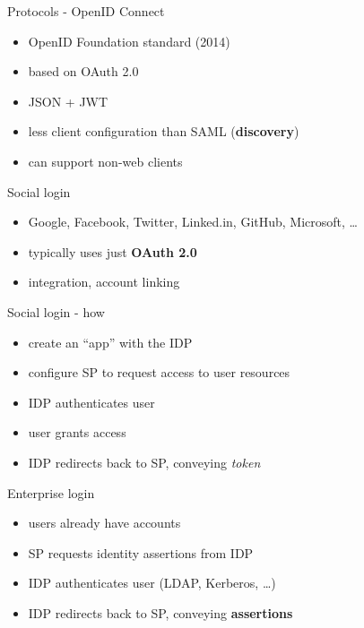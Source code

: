 \documentclass[ignorenonframetext,aspectratio=169]{beamer}
\providecommand{\tightlist}{%
  \setlength{\itemsep}{0pt}\setlength{\parskip}{0pt}}
\begin{document}
\begin{frame}{Protocols - OpenID Connect}

\begin{itemize}
\tightlist
\item OpenID Foundation standard (2014)
\item based on OAuth 2.0
\item JSON + JWT
\item less client configuration than SAML ({\bf discovery})
\item can support non-web clients
\end{itemize}

\end{frame}

\begin{frame}{Social login}

\begin{itemize}
\tightlist
\item
  Google, Facebook, Twitter, Linked.in, GitHub, Microsoft, \ldots{}
\item
  typically uses just \textbf{OAuth 2.0}
\item
  integration, account linking
\end{itemize}

\end{frame}

\begin{frame}{Social login - how}

\begin{itemize}
\tightlist
\item
  create an ``app'' with the IDP
\item
  configure SP to request access to user resources
\item
  IDP authenticates user
\item
  user grants access
\item
  IDP redirects back to SP, conveying \emph{token}
\end{itemize}

\end{frame}

\begin{frame}{Enterprise login}

\begin{itemize}
\tightlist
\item
  users already have accounts
\item
  SP requests identity assertions from IDP
\item
  IDP authenticates user (LDAP, Kerberos, \ldots{})
\item
  IDP redirects back to SP, conveying \textbf{assertions}
\end{itemize}

\end{frame}
\end{document}
